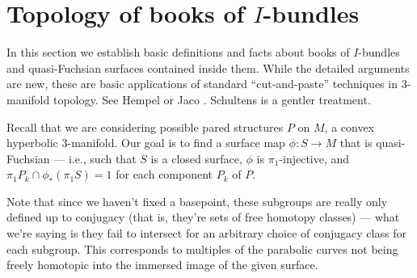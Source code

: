 \section{Topology of books of \texorpdfstring{$I$}{I}-bundles}

In this section we establish basic definitions and facts about books of
$I$-bundles and quasi-Fuchsian surfaces contained inside them. While the
detailed arguments are new, these are basic applications of standard
``cut-and-paste'' techniques in $3$-manifold topology. See Hempel \cite{He} or
Jaco \cite{Ja}. Schultens \cite{Sch} is a gentler treatment.

Recall that we are considering possible pared structures $P$ on $M$, a convex
hyperbolic $3$-manifold. Our goal is to find a surface map $\phi \colon S \to
M$ that is quasi-Fuchsian --- i.e., such that $S$ is a closed surface, $\phi$
is $\pi_1$-injective, and $\pi_1P_k \cap \phi_*(\pi_1S) = 1$ for each component
$P_k$ of $P$.

Note that since we haven't fixed a basepoint, these subgroups are really only
defined up to conjugacy (that is, they're sets of free homotopy classes) ---
what we're saying is they fail to intersect for an arbitrary choice of
conjugacy class for each subgroup. This corresponds to multiples of the
parabolic curves not being freely homotopic into the immersed image of the
given surface.


